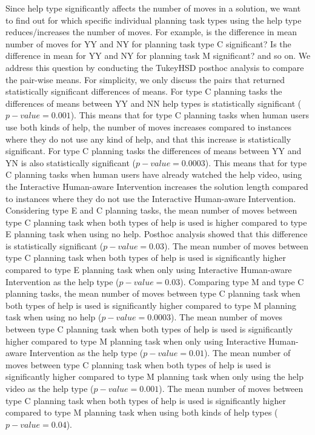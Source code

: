 Since help type significantly affects the number of moves in a solution, we want to find out for which specific individual planning task types using the help type reduces/increases the number of moves.
For example, is the difference in mean number of moves for YY and NY for planning task type C significant?
Is the difference in mean for YY and NY for planning task M significant? and so on.
We address this question by conducting the TukeyHSD posthoc analysis to compare the pair-wise means.
For simplicity, we only discuss the pairs that returned statistically significant differences of means.
For type C planning tasks the differences of means between YY and NN help types is statistically significant ($p-value=0.001$).
This means that for type C planning tasks when human users use both kinds of help, the number of moves increases compared to instances where they do not use any kind of help, and that this increase is statistically significant.
For type C planning tasks the differences of means between YY and YN is also statistically significant ($p-value=0.0003$).
This means that for type C planning tasks when human users have already watched the help video, using the Interactive Human-aware Intervention increases the solution length compared to instances where they do not use the Interactive Human-aware Intervention.
Considering type E and C planning tasks, the mean number of moves between type C planning task when both types of help is used is higher compared to type E planning task when using no help.
Posthoc analysis showed that this difference is statistically significant ($p-value=0.03$).
The mean number of moves between type C planning task when both types of help is used is significantly higher compared to type E planning task when only using Interactive Human-aware Intervention as the help type ($p-value=0.03$).
Comparing type M and type C planning tasks, the mean number of moves between type C planning task when both types of help is used is significantly higher compared to type M planning task when using no help ($p-value=0.0003$).
The mean number of moves between type C planning task when both types of help is used is significantly higher compared to type M planning task when only using Interactive Human-aware Intervention as the help type ($p-value=0.01$).
The mean number of moves between type C planning task when both types of help is used is significantly higher compared to type M planning task when only using the help video as the help type ($p-value=0.001$).
The mean number of moves between type C planning task when both types of help is used is significantly higher compared to type M planning task when using both kinds of help types ($p-value=0.04$).

